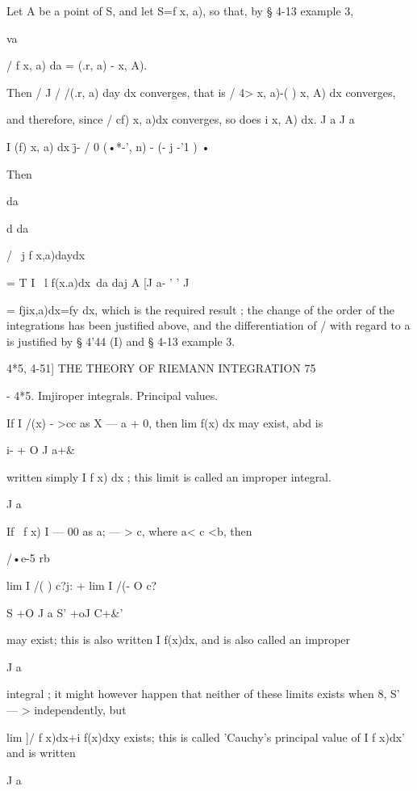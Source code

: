 Let A be a point of S, and let  S=f x, a), so that, by § 4-13 example 3, 

va 

/ f x, a) da =   (.r, a) -  x, A). 

Then / J / /(.r, a) day dx converges, that is /  4>  x, a)-( ) x, A)  dx converges, 

and therefore, since / cf)  x, a)dx converges, so does i  x, A) dx. 
J a J a 

I (f)  x, a) dx \=j- /  0 (•*-', n) - (- j -'1 )   •  



Then 



da 



d  
da 



/ \ j f x,a)daydx\ 

= T I \ l f(x.a)dx\ da 
daj A [J a-  ' ' J 

= fjix,a)dx=fy dx, 
which is the required result ; the change of the order of the integrations has been justified 
above, and the differentiation of / with regard to a is justified by § 4'44 (I) and § 4-13 
example 3. 



4*5, 4-51] THE THEORY OF RIEMANN INTEGRATION 75 

-  4*5. Imjiroper integrals. Principal values. 

If I /(x)  - >cc as X —  a + 0, then lim f(x) dx may exist, abd is 

i-  + O J a+\& 

written simply I f x) dx ; this limit is called an improper integral. 

J a 

If \ f x) I —   00 as a; — > c, where a< c <b, then 

/•e-5 rb 

lim I /( ) c?j:  + lim I /(- O c?  

S +O J a S' +oJ C+\&' 

may exist; this is also written I f(x)dx, and is also called an improper 

J a 

integral ; it might however happen that neither of these limits exists when 
8, S' — > independently, but 

lim ]/ f x)dx+i f(x)dxy 
exists; this is called 'Cauchy's principal value of I f x)dx' and is written 

J a 

